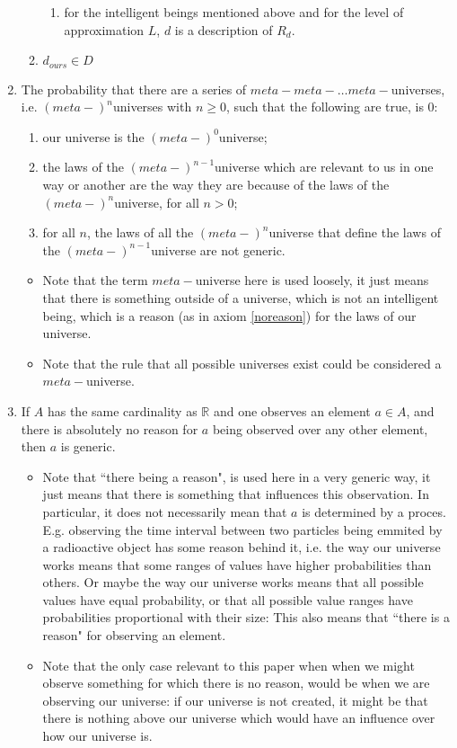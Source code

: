 \documentclass[a4paper
,draft
]{article}
\def\reale{\mathbb{R}}
\newcommand{\ghilimele}[1]{``#1"}
\begin{document}
\begin{enumerate}
\begin{enumerate}
\begin{enumerate}
        \item for the intelligent beings mentioned above and for the level of approximation $L$, $d$ is a description of $R_d$.
      \end{enumerate}
    \item $d_{ours}\in D$
  \end{enumerate}
\item \label{infinitechain} The probability that there are a series of $meta-meta-\dots meta-$universes, i.e. $(meta-)^n$universes with $n\ge 0$, such that the following are true, is $0$:
  \begin{enumerate}
    \item our universe is the $(meta-)^0$universe;
    \item the laws of the $(meta-)^{n-1}$universe which are relevant to us in one way or another are the way they are because of the laws of the $(meta-)^n$universe, for all $n > 0$;
    \item for all $n$, the laws of all the $(meta-)^n$universe that define the laws of the $(meta-)^{n-1}$universe are not generic.
  \end{enumerate}
  \begin{itemize}
    \item Note that the term $meta-$universe here is used loosely, it just means that there is something outside of a universe, which is not an intelligent being, which is a reason (as in axiom \ref{noreason}) for the laws of our universe.
    \item Note that the rule that all possible universes exist could be considered a $meta-$universe.
  \end{itemize}
\item \label{noreason} If $A$ has the same cardinality as $\reale$ and one observes an element $a\in A$, and there is absolutely no reason for $a$ being observed over any other element, then $a$ is generic.
  \begin{itemize}
    \item Note that \ghilimele{there being a reason}, is used here in a very generic way, it just means that there is something that influences this observation. In particular, it does not necessarily mean that $a$ is determined by a proces. E.g. observing the time interval between two particles being emmited by a radioactive object has some reason behind it, i.e. the way our universe works means that some ranges of values have higher probabilities than others. Or maybe the way our universe works means that all possible values have equal probability, or that all possible value ranges have probabilities proportional with their size: This also means that \ghilimele{there is a reason} for observing an element.
    \item Note that the only case relevant to this paper when when we might observe something for which there is no reason, would be when we are observing our universe: if our universe is not created, it might be that there is nothing above our universe which would have an influence over how our universe is.
  \end{itemize}
\end {enumerate}
\end{document}
